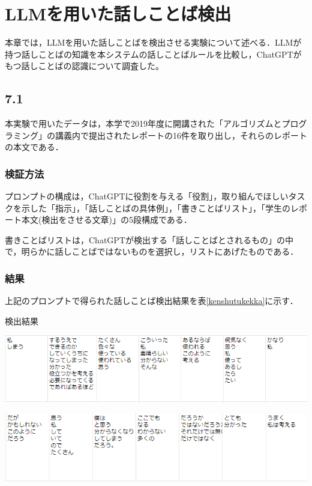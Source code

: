\chapter{LLMを用いた話しことば検出 \label{c7o}}

本章では，LLMを用いた話しことばを検出させる実験について述べる．LLMが持つ話しことばの知識を本システムの話しことばルールを比較し，ChatGPTがもつ話しことばの認識について調査した。

\section{7.1 \label{c7os1}}
本実験で用いたデータは，本学で2019年度に開講された「アルゴリズムとプログラミング」の講義内で提出されたレポートの16件を取り出し，それらのレポートの本文である．

\subsection{検証方法}
プロンプトの構成は，ChatGPTに役割を与える「役割」，取り組んでほしいタスクを示した「指示」，「話しことばの具体例」，「書きことばリスト」，「学生のレポート本文(検出をさせる文章)」の5段構成である．




書きことばリストは，ChatGPTが検出する「話しことばとされるもの」の中で，明らかに話しことばではないものを選択し，リストにあげたものである．

\subsection{結果}
上記のプロンプトで得られた話しことば検出結果を表\ref{kenshutukekka}に示す．

\begin{table}[H]
	\centering
        \caption{検出結果}
 	\includegraphics[width=150mm]{image/kenshutukekka-a.png}
	\label{kenshutukekka}
\end{table}
\begin{table}[H]
    \centering
    \includegraphics[width=150mm]{image/kenshutukekka-b.png}
    \label{kenshutukekka-2}
\end{table}

